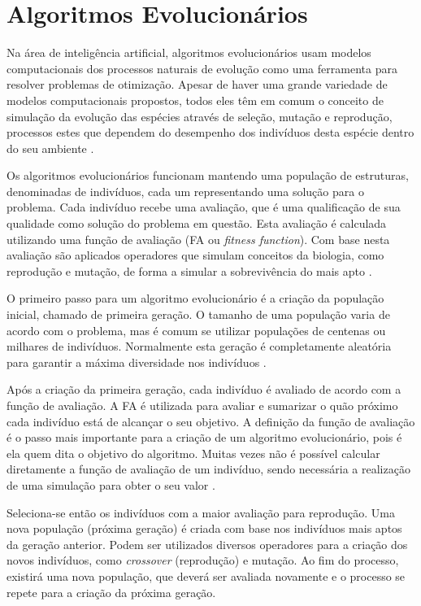 \documentclass[12pt,oneside,a4paper,english,french,spanish,brazil,]{abntex2}
\begin{document}
\section{Algoritmos Evolucionários}
\label{sec:que}
Na área de inteligência artificial, algoritmos evolucionários usam modelos computacionais dos processos naturais de evolução como uma ferramenta para resolver problemas de otimização. Apesar de haver uma grande variedade de modelos computacionais propostos, todos eles têm em comum o conceito de simulação da evolução das espécies através de seleção, mutação e reprodução, processos estes que dependem do desempenho dos indivíduos desta espécie dentro do seu ambiente \cite{linden:2008}.

Os algoritmos evolucionários funcionam mantendo uma população de estruturas, denominadas de indivíduos, cada um representando uma solução para o problema. Cada indivíduo recebe uma avaliação, que é uma qualificação de sua qualidade como solução do problema em questão. Esta avaliação é calculada utilizando uma função de avaliação (FA ou \textit{fitness function}). Com base nesta avaliação são aplicados operadores que simulam conceitos da biologia, como reprodução e mutação, de forma a simular a sobrevivência do mais apto \cite{linden:2008}.

O primeiro passo para um algoritmo evolucionário é a criação da população inicial, chamado de primeira geração. O tamanho de uma população varia de acordo com o problema, mas é comum se utilizar populações de centenas ou milhares de indivíduos. Normalmente esta geração é completamente aleatória para garantir a máxima diversidade nos indivíduos \cite{linden:2008}.

Após a criação da primeira geração, cada indivíduo é avaliado de acordo com a função de avaliação. A FA é utilizada para avaliar e sumarizar o quão próximo cada indivíduo está de alcançar o seu objetivo. A definição da função de avaliação é o passo mais importante para a criação de um algoritmo evolucionário, pois é ela quem dita o objetivo do algoritmo. Muitas vezes não é possível calcular diretamente a função de avaliação de um indivíduo, sendo necessária a realização de uma simulação para obter o seu valor \cite{linden:2008}.

Seleciona-se então os indivíduos com a maior avaliação para reprodução. Uma nova população (próxima geração) é criada com base nos indivíduos mais aptos da geração anterior. Podem ser utilizados diversos operadores para a criação dos novos indivíduos, como \textit{crossover} (reprodução) e mutação. Ao fim do processo, existirá uma nova população, que deverá ser avaliada novamente e o processo se repete para a criação da próxima geração.
\end{document}
